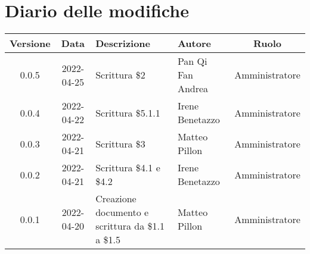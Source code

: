 \section*{Diario delle modifiche}
	\begin{center}
	\renewcommand{\arraystretch}{1.8} %
	\begin{tabular}{ |c|c|m{12em}|m{7em}|c| }
	\hline
	\textbf{Versione} & \textbf{Data} & \textbf{Descrizione} &  \textbf{Autore} &  \textbf{Ruolo} \\ %
	\hline
	0.0.5& 2022-04-25 & Scrittura \$2 & Pan Qi Fan \newline Andrea & Amministratore\\
	\hline
	0.0.4 & 2022-04-22 & Scrittura \$5.1.1 & Irene Benetazzo & Amministratore\\
	\hline 
	0.0.3 & 2022-04-21 & Scrittura \$3 & Matteo Pillon & Amministratore\\
	\hline
	0.0.2 & 2022-04-21 & Scrittura \$4.1 e \$4.2 & Irene Benetazzo & Amministratore\\
	\hline
    0.0.1 & 2022-04-20 & Creazione documento e scrittura da \$1.1 a \$1.5 & Matteo Pillon & Amministratore\\ %
	\hline
	\end{tabular}
	\end{center}
	\newpage